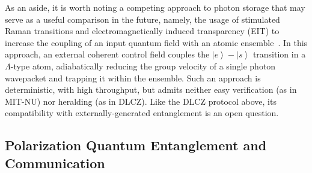 \documentclass[aps,twocolumn,secnumarabic,amsmath,amssymb,pra,groupedaddress,
showpacs, showkeys]{revtex4-1}
\newcommand{\ket}[1]{\left|#1\right\rangle}
\begin{document}
As an aside, it is worth noting a competing approach to photon storage that may
serve as a useful comparison in the future, namely, the usage of stimulated
Raman transitions and electromagnetically induced transparency (EIT) to
increase the coupling of an input quantum field with an atomic
ensemble~\cite{PhysRevA.65.022314,RevModPhys.75.457,PhysRevLett.98.123601,PhysRevA.76.033804}. In
this approach, an external coherent control field couples the $\ket{e}-\ket{s}$
transition in a $\Lambda$-type atom, adiabatically reducing the group velocity
of a single photon wavepacket and trapping it within the ensemble. Such an
approach is deterministic, with high throughput, but admits neither easy
verification (as in MIT-NU) nor heralding (as in DLCZ). Like the DLCZ protocol
above, its compatibility with externally-generated entanglement is an open
question.


\subsection{Polarization Quantum Entanglement and Communication\label{sec:intro:entanglement}}
\end{document}

